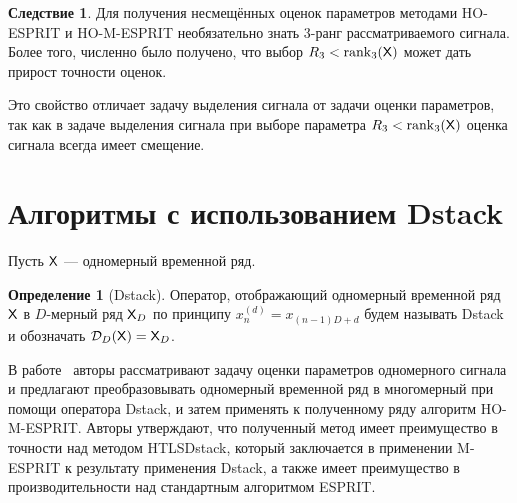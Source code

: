 \documentclass[specialist,
  substylefile=spbu_report.rtx,
subf,href,colorlinks=true, 12pt]{disser}
\theoremstyle{plain}
\theoremstyle{definition}
\newtheorem{definition}{Определение}[section]
\newtheorem*{corollary}{Следствие}
\theoremstyle{remark}
\begin{document}
\begin{corollary}
  Для получения несмещённых оценок параметров методами HO-ESPRIT и HO-M-ESPRIT
  необязательно знать 3-ранг рассматриваемого сигнала.
  Более того, численно было получено, что выбор $R_3 <
  \operatorname{rank}_3(\mathsf{X})$
  может дать прирост точности оценок.
\end{corollary}

Это свойство отличает задачу выделения сигнала от задачи оценки
параметров, так как в задаче выделения сигнала при выборе параметра $R_3 <
\operatorname{rank}_3(\mathsf{X})$ оценка сигнала всегда имеет смещение.

\section{Алгоритмы с использованием Dstack}\label{sec:dstack}
Пусть $\mathsf{X}$ --- одномерный временной ряд.
\begin{definition}[Dstack]
  Оператор, отображающий одномерный временной ряд $\mathsf{X}$ в
  $D$-мерный ряд $\mathsf{X}_D$
  по принципу $x_n^{(d)} = x_{(n-1)D + d}$ будем называть Dstack и
  обозначать $\mathcal{D}_D(\mathsf{X}) = \mathsf{X}_D$.
\end{definition}
В работе~\cite{Papy2009} авторы рассматривают задачу оценки
параметров одномерного сигнала и предлагают преобразовывать
одномерный временной ряд в многомерный при помощи оператора Dstack, и
затем применять к полученному ряду алгоритм HO-M-ESPRIT.
Авторы утверждают, что полученный метод имеет преимущество в точности над
методом HTLSDstack, который заключается в применении M-ESPRIT к
результату применения Dstack, а также имеет преимущество в
производительности над стандартным алгоритмом ESPRIT.
\end{document}

